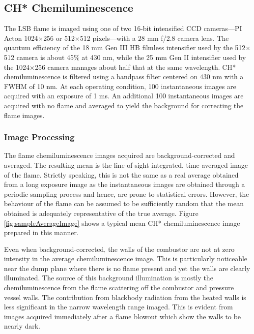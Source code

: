 \subsection{CH* Chemiluminescence}
\label{subsec:experimental-ch-chemiluminescence}

The LSB flame is imaged using one of two 16-bit intensified CCD cameras---PI Acton 1024\(\times\)256 or 512\(\times\)512 pixels---with a 28 mm f/2.8 camera lens.
The quantum efficiency of the 18 mm Gen III HB filmless intensifier used by the 512\(\times\)512 camera is about 45\% at 430 nm, while the 25 mm Gen II intensifier used by the 1024\(\times\)256 camera manages about half that at the same wavelength.
CH* chemiluminescence is filtered using a bandpass filter centered on 430 nm with a FWHM of 10 nm.
At each operating condition, 100 instantaneous images are acquired with an exposure of 1 ms.
An additional 100 instantaneous images are acquired with no flame and averaged to yield the background for correcting the flame images.

\subsubsection{Image Processing}
\label{subsubsec:chemiluminescence-image-processing}



The flame chemiluminescence images acquired are background-corrected and averaged.
The resulting mean is the line-of-sight integrated, time-averaged image of the flame.
Strictly speaking, this is not the same as a real average obtained from a long exposure image as the instantaneous images are obtained through a periodic sampling process and hence, are prone to statistical errors.
However, the behaviour of the flame can be assumed to be sufficiently random that the mean obtained is adequately representative of the true average.
Figure \ref{fig:sampleAverageImage} shows a typical mean CH* chemiluminescence image prepared in this manner.

Even when background-corrected, the walls of the combustor are not at zero intensity in the average chemiluminescence image.
This is particularly noticeable near the dump plane where there is no flame present and yet the walls are clearly illuminated.
The source of this background illumination is mostly the chemiluminescence from the flame scattering off the combustor and pressure vessel walls.
The contribution from blackbody radiation from the heated walls is less significant in the narrow wavelength range imaged.
This is evident from images acquired immediately after a flame blowout which show the walls to be nearly dark.


